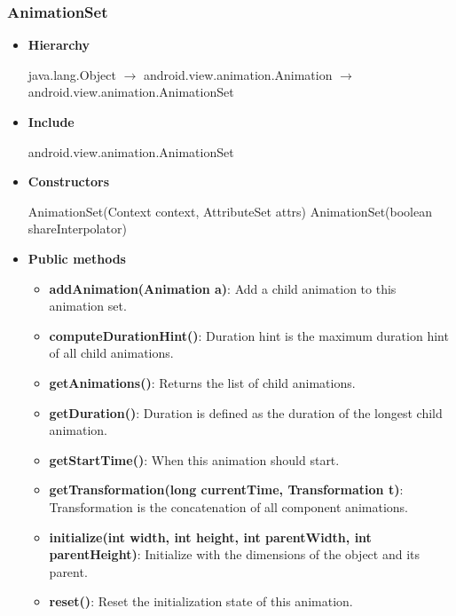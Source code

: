 \documentclass{report}
\begin{document}
    \subsubsection{AnimationSet}
    \begin{itemize}
        \item \textbf{Hierarchy}
            \begin{center}
               java.lang.Object $\to$	android.view.animation.Animation $\to$	android.view.animation.AnimationSet
            \end{center}
        \item \textbf{Include}
            \bigbreak \noindent 
            \begin{javacode}
                android.view.animation.AnimationSet
            \end{javacode}
        \item \textbf{Constructors}
            \bigbreak \noindent 
            \begin{javacode}
                AnimationSet(Context context, AttributeSet attrs)
                AnimationSet(boolean shareInterpolator)
            \end{javacode}
        \item \textbf{Public methods}
            \begin{itemize}
                \item \textbf{addAnimation(Animation a)}: Add a child animation to this animation set.
                \item \textbf{computeDurationHint()}: Duration hint is the maximum duration hint of all child animations.
                \item \textbf{getAnimations()}: Returns the list of child animations.
                \item \textbf{getDuration()}: Duration is defined as the duration of the longest child animation.
                \item \textbf{getStartTime()}: When this animation should start.
                \item \textbf{getTransformation(long currentTime, Transformation t)}: Transformation is the concatenation of all component animations.
                \item \textbf{initialize(int width, int height, int parentWidth, int parentHeight)}: Initialize with the dimensions of the object and its parent.
                \item \textbf{reset()}: Reset the initialization state of this animation.

\end{itemize}
\end{itemize}
\end{document}
